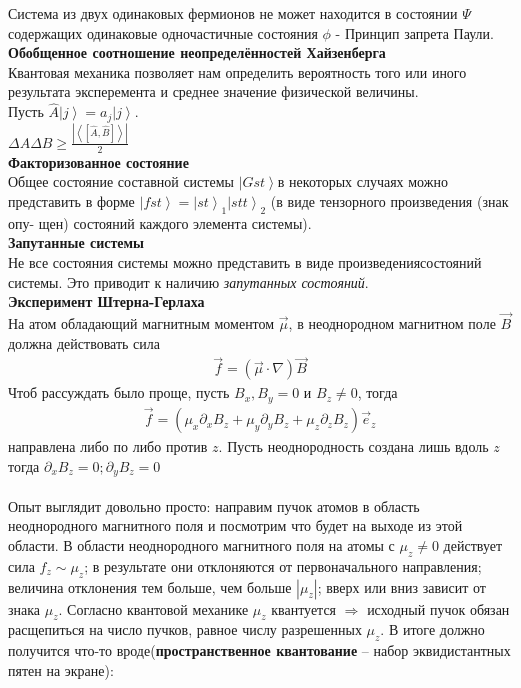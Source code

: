 \documentclass[__main__.tex]{subfiles}
\begin{document}
	Система из двух одинаковых фермионов не может находится в состоянии $\Psi$ содержащих одинаковые одночастичные состояния $\phi$ - Принцип запрета Паули.\\
	\textbf{Обобщенное соотношение неопределённостей Хайзенберга}\\
	Квантовая механика позволяет нам определить вероятность того или иного результата эксперемента и среднее значение физической величины.\\
	Пусть $\hat{A}\left|j\right> = a_j \left|j\right>$.\\
	$\Delta{A}\Delta{B}\ge\frac{\left|\left<\left[\hat{A},\hat{B}\right]\right>\right|}{2}$\\
	\textbf{Факторизованное состояние}\\
	Общее состояние составной системы $ \left|Gst\right>$в некоторых случаях можно представить в форме $\left|fst\right> = \left|st\right>_1\left|stt\right>_2$
	  (в виде тензорного произведения (знак опу-
	щен) состояний каждого элемента системы).\\
	\textbf{Запутанные системы}\\
	Не все состояния системы можно представить в виде произведениясостояний системы. Это приводит к наличию \textit{запутанных состояний}.\\
	\textbf{Эксперимент Штерна-Герлаха}\\
	На атом обладающий магнитным моментом $\vec{\mu}$, в неоднородном магнитном поле $\vec{B}$ должна действовать сила
	\begin{gather*}
		\vec{f} = \left(\vec{\mu}\cdot\nabla\right)\vec{B}
	\end{gather*}
	Чтоб рассуждать было проще, пусть $B_x, B_y = 0$  и $B_z \neq 0$, тогда
	\begin{gather*}
		\vec{f} = \left(\mu_x\partial_xB_z+\mu_y\partial_yB_z+\mu_z\partial_zB_z\right)\vec{e}_z
	\end{gather*}
	направлена либо по либо против $z$. Пусть неоднородность создана лишь вдоль $z$ тогда $\partial_xB_z=0; \partial_yB_z=0$\\\\
	Опыт выглядит довольно просто: направим пучок атомов в область неоднородного магнитного поля и посмотрим что будет на выходе из этой области.
	В области неоднородного магнитного поля на атомы с $\mu_z \neq 0$ действует сила $f_z \sim \mu_z$; в результате они отклоняются от первоначального направления; величина отклонения тем больше, чем больше $|\mu_z|$; вверх или вниз зависит от знака $\mu_z$.
	Согласно квантовой механике $\mu_z$ квантуется $\Rightarrow$ исходный пучок обязан расщепиться на число пучков, равное числу разрешенных $\mu_z$. В итоге должно получится что-то вроде(\textbf{пространственное квантование} -- набор эквидистантных пятен на экране):
\end{document}
